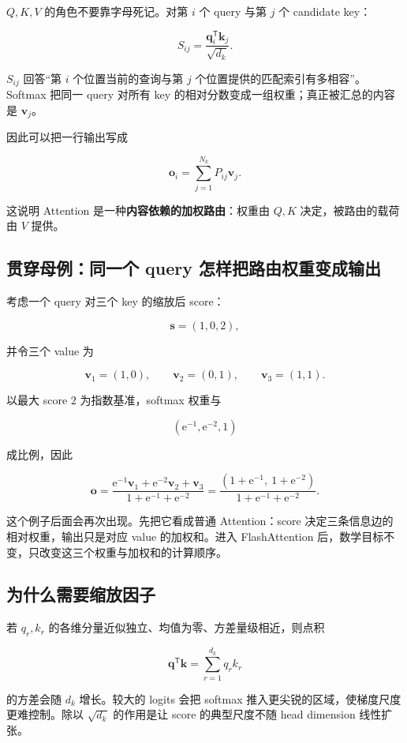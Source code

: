 \documentclass[profile=standard,twoside=false]{ipara-handbook}
\begin{document}
$Q,K,V$ 的角色不要靠字母死记。对第 $i$ 个 query 与第 $j$ 个 candidate key：

$$
S_{ij}
=\frac{\boldsymbol{q}_i^{\mathsf T}\boldsymbol{k}_j}{\sqrt{d_k}}.
$$

$S_{ij}$ 回答“第 $i$ 个位置当前的查询与第 $j$ 个位置提供的匹配索引有多相容”。Softmax 把同一 query 对所有 key 的相对分数变成一组权重；真正被汇总的内容是 $\boldsymbol{v}_j$。

因此可以把一行输出写成

$$
\boldsymbol{o}_i
=\sum_{j=1}^{N_k}P_{ij}\boldsymbol{v}_j.
$$

这说明 Attention 是一种\textbf{内容依赖的加权路由}：权重由 $Q,K$ 决定，被路由的载荷由 $V$ 提供。

\subsection{贯穿母例：同一个 query 怎样把路由权重变成输出}

考虑一个 query 对三个 key 的缩放后 score：

$$
\boldsymbol{s}=(1,0,2),
$$

并令三个 value 为

$$
\boldsymbol{v}_1=(1,0),\qquad
\boldsymbol{v}_2=(0,1),\qquad
\boldsymbol{v}_3=(1,1).
$$

以最大 score $2$ 为指数基准，softmax 权重与

$$
\left(\mathrm{e}^{-1},\mathrm{e}^{-2},1\right)
$$

成比例，因此

$$
\boldsymbol{o}
=
\frac{
\mathrm{e}^{-1}\boldsymbol{v}_1
+\mathrm{e}^{-2}\boldsymbol{v}_2
+\boldsymbol{v}_3
}{1+\mathrm{e}^{-1}+\mathrm{e}^{-2}}
=
\frac{(1+\mathrm{e}^{-1},\ 1+\mathrm{e}^{-2})}
{1+\mathrm{e}^{-1}+\mathrm{e}^{-2}}.
$$

这个例子后面会再次出现。先把它看成普通 Attention：score 决定三条信息边的相对权重，输出只是对应 value 的加权和。进入 FlashAttention 后，数学目标不变，只改变这三个权重与加权和的计算顺序。

\subsection{为什么需要缩放因子}

若 $q_r,k_r$ 的各维分量近似独立、均值为零、方差量级相近，则点积

$$
\boldsymbol{q}^{\mathsf T}\boldsymbol{k}
=\sum_{r=1}^{d_k}q_rk_r
$$

的方差会随 $d_k$ 增长。较大的 logits 会把 softmax 推入更尖锐的区域，使梯度尺度更难控制。除以 $\sqrt{d_k}$ 的作用是让 score 的典型尺度不随 head dimension 线性扩张。
\end{document}

